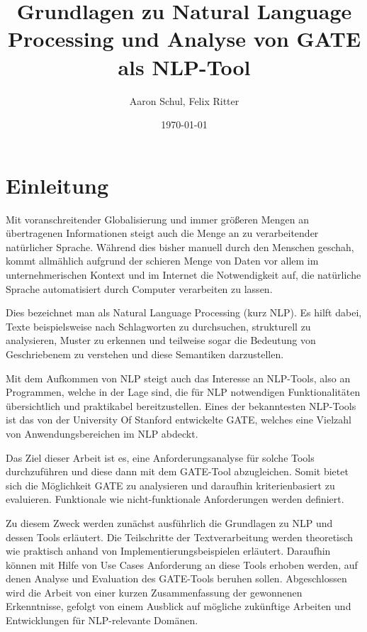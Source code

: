 \documentclass[12pt]{article}
\begin{document}
\title{Grundlagen zu Natural Language Processing und Analyse von GATE als NLP-Tool}
\author{Aaron Schul, Felix Ritter}
\date{\today}
\maketitle

\newpage
\tableofcontents

\newpage
\section{Einleitung}
Mit voranschreitender Globalisierung und immer größeren Mengen an übertragenen Informationen steigt auch die Menge an zu verarbeitender natürlicher Sprache. Während dies bisher manuell durch den Menschen geschah, kommt allmählich aufgrund der schieren Menge von Daten vor allem im unternehmerischen Kontext und im Internet die Notwendigkeit auf, die natürliche Sprache automatisiert durch Computer verarbeiten zu lassen.

Dies bezeichnet man als Natural Language Processing (kurz NLP). Es hilft dabei, Texte beispielsweise nach Schlagworten zu durchsuchen, strukturell zu analysieren, Muster zu erkennen und teilweise sogar die Bedeutung von Geschriebenem zu verstehen und diese Semantiken darzustellen.

Mit dem Aufkommen von NLP steigt auch das Interesse an NLP-Tools, also an Programmen, welche in der Lage sind, die für NLP notwendigen Funktionalitäten übersichtlich und praktikabel bereitzustellen. Eines der bekanntesten NLP-Tools ist das von der University Of Stanford entwickelte GATE, welches eine Vielzahl von Anwendungsbereichen im NLP abdeckt.

Das Ziel dieser Arbeit ist es, eine Anforderungsanalyse für solche Tools durchzuführen und diese dann mit dem GATE-Tool abzugleichen. Somit bietet sich die Möglichkeit GATE zu analysieren und daraufhin kriterienbasiert zu evaluieren. Funktionale wie nicht-funktionale Anforderungen werden definiert.

Zu diesem Zweck werden zunächst ausführlich die Grundlagen zu NLP und dessen Tools erläutert. Die Teilschritte der Textverarbeitung werden theoretisch wie praktisch anhand von Implementierungsbeispielen erläutert. Daraufhin können mit Hilfe von Use Cases Anforderung an diese Tools erhoben werden, auf denen Analyse und Evaluation des GATE-Tools beruhen sollen. Abgeschlossen wird die Arbeit von einer kurzen Zusammenfassung der gewonnenen Erkenntnisse, gefolgt von einem Ausblick auf mögliche zukünftige Arbeiten und Entwicklungen für NLP-relevante Domänen. 
\newpage
\end{document}

